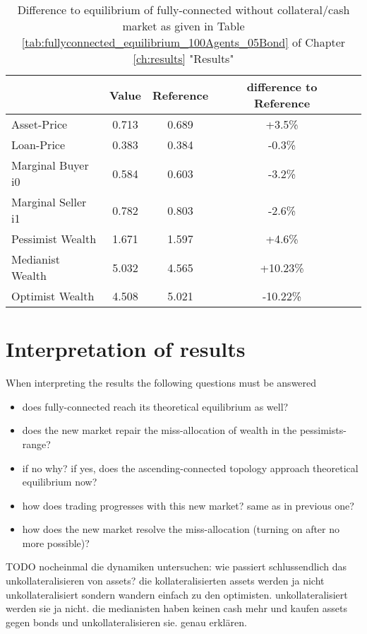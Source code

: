 \documentclass[Bachelorarbeit.tex]{subfiles}
\begin{document}
\begin{table}[h]
	\caption{Difference to equilibrium of fully-connected without collateral/cash market as given in Table \ref{tab:fullyconnected_equilibrium_100Agents_05Bond} of Chapter \ref{ch:results} "Results"}
	\centering
	\begin{tabular} { l c c c r }
		& Value & Reference & difference to Reference \\
		\hline
		Asset-Price & 0.713 & 0.689 & +3.5\% \\
		Loan-Price & 0.383 & 0.384 & -0.3\% \\
		Marginal Buyer i0 & 0.584 & 0.603 & -3.2\% \\
		Marginal Seller i1 & 0.782 & 0.803 & -2.6\% \\
		\hline
		Pessimist Wealth & 1.671 & 1.597 & +4.6\% \\
		Medianist Wealth & 5.032 & 4.565 & +10.23\% \\
		Optimist Wealth & 4.508 & 5.021 & -10.22\% \\
		\hline
	\end{tabular}
\end{table} 

\section{Interpretation of results}
When interpreting the results the following questions must be answered

\begin{itemize}
\item does fully-connected reach its theoretical equilibrium as well?
\item does the new market repair the miss-allocation of wealth in the pessimists-range?
\item if no why? if yes, does the ascending-connected topology approach theoretical equilibrium now?
\item how does trading progresses with this new market? same as in previous one?
\item how does the new market resolve the miss-allocation (turning on after no more possible)?
\end{itemize}

TODO nocheinmal die dynamiken untersuchen: wie passiert schlussendlich das unkollateralisieren von assets? die kollateralisierten assets werden ja nicht unkollateralisiert sondern wandern einfach zu den optimisten. unkollateralisiert werden sie ja nicht. die medianisten haben keinen cash mehr und kaufen assets gegen bonds und unkollateralisieren sie. genau erklären.
\end{document}
